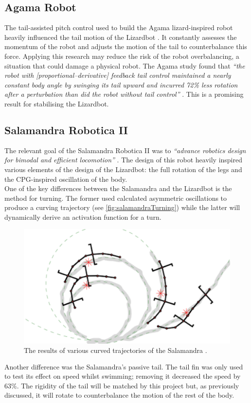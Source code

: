 \documentclass{article}
\begin{document}
\subsection{Agama Robot}
\label{sec:Agama Robot}
The tail-assisted pitch control used to build the Agama lizard-inspired robot heavily influenced the tail motion of the Lizardbot . It constantly assesses the momentum of the robot and adjusts the motion of the tail to counterbalance this force. Applying this research may reduce the risk of the robot overbalancing, a situation that could damage a physical robot. The Agama study found that \textit{“the robot with [proportional–derivative] feedback tail control maintained a nearly constant body angle by swinging its tail upward and incurred 72\% less rotation after a perturbation than did the robot without tail control”} . This is a promising result for stabilising the Lizardbot.

\newpage
\subsection{Salamandra Robotica II}
\label{sec:Salamandra Robotica II}
The relevant goal of the Salamandra Robotica II  was to \textit{“advance robotics design for bimodal and efficient locomotion”} . The design of this robot heavily inspired various elements of the design of the Lizardbot: the full rotation of the legs and the CPG-inspired oscillation of the body. \\

One of the key differences between the Salamandra and the Lizardbot is the method for turning. The former used calculated asymmetric oscillations to produce a curving trajectory (see \autoref{fig:salamandraTurning}) while the latter will dynamically derive an activation function for a turn. \\
\begin{figure}[H]
\centering
\includegraphics[scale=0.7]{salamandraTurning}
\caption{The results of various curved trajectories of the Salamandra \citep{salamandra}.}
\label{fig:salamandraTurning}
\end{figure}
Another difference was the Salamandra’s passive tail. The tail fin was only used to test its effect on speed whilst swimming; removing it decreased the speed by 63\%. The rigidity of the tail will be matched by this project but, as previously discussed, it will rotate to counterbalance the motion of the rest of the body.
\end{document}
